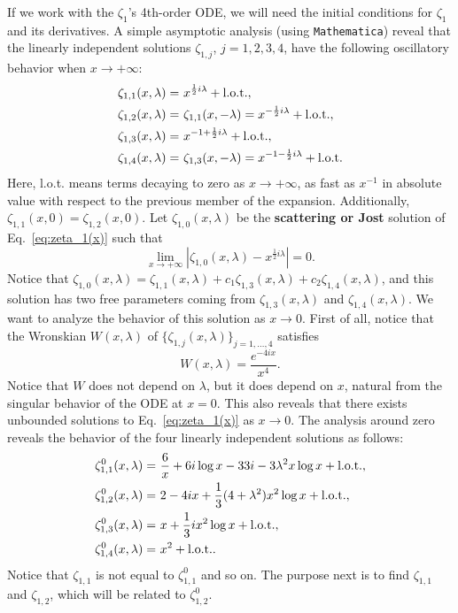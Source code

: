 \documentclass[
 aip,
 jmp,
 amsmath,amssymb,
 reprint,
 nofootinbib,
]{revtex4-2}
\begin{document}
If we work with the $\zeta_1$'s 4th-order ODE, we will need the initial conditions for $\zeta_1$ and its derivatives. A simple asymptotic analysis (using \texttt{Mathematica}) reveal that the linearly independent solutions $\zeta_{1,j}$, $j=1,2,3,4$,  have the following oscillatory behavior when $x\to +\infty$:
\begin{equation}
\begin{aligned}
\zeta_{1,1}(x,\lambda) =&~{} x^{ \frac12 i \lambda}+ \hbox{l.o.t.},\\
\zeta_{1,2}(x,\lambda) =&~{} \zeta_{1,1}(x,-\lambda) = x^{- \frac12 i \lambda}+ \hbox{l.o.t.},\\
\zeta_{1,3}(x,\lambda) =&~{} x^{-1+ \frac12 i \lambda}+ \hbox{l.o.t.},\\
\zeta_{1,4}(x,\lambda) =&~{} \zeta_{1,3}(x,-\lambda) =x^{-1- \frac12 i \lambda}+ \hbox{l.o.t.}
\end{aligned}
\end{equation}
Here, l.o.t. means terms decaying to zero as $x\to +\infty$, as fast as $x^{-1}$ in absolute value with respect to the previous member of the expansion. Additionally, $\zeta_{1,1}(x,0)=\zeta_{1,2}(x,0)$. Let $\zeta_{1,0}(x,\lambda)$ be the {\bf scattering or Jost} solution of Eq.~\eqref{eq:zeta_1(x)} such that 
\begin{equation}
\lim_{x\to +\infty} |\zeta_{1,0}(x,\lambda) - x^{ \frac12 i \lambda} | =0.
\end{equation}
Notice that $\zeta_{1,0}(x,\lambda) = \zeta_{1,1}(x,\lambda) + c_1 \zeta_{1,3}(x,\lambda) +c_2 \zeta_{1,4}(x,\lambda)$, and this solution has two free parameters coming from $\zeta_{1,3}(x,\lambda)$ and $\zeta_{1,4}(x,\lambda) $. We want to analyze the behavior of this solution as $x\to 0$. First of all, notice that the Wronskian $W(x,\lambda)$ of $\{\zeta_{1,j}(x,\lambda)\}_{j=1,\ldots,4}$ satisfies
\begin{equation}
W(x,\lambda) = \frac{e^{-4ix}}{x^4}.
\end{equation}
Notice that $W$ does not depend on $\lambda$, but it does depend on $x$, natural from the singular behavior of the ODE at $x=0$. This also reveals that there exists unbounded solutions to Eq.~\eqref{eq:zeta_1(x)} as $x\to 0$. The analysis around zero reveals the behavior of the four linearly independent solutions as follows:
\begin{equation}\label{eq:asymptotic-behaviour-x-zero}
\begin{aligned}
\zeta_{1,1}^0(x,\lambda) =&~{} \frac6x + 6i \log x -33i -3\lambda^2 x\log x+ \hbox{l.o.t.},\\
\zeta_{1,2}^0(x,\lambda) =&~{} 2-4ix +\frac13 (4+\lambda^2) x^2 \log x+ \hbox{l.o.t.},\\
\zeta_{1,3}^0(x,\lambda) =&~{} x +\frac13ix^2\log x + \hbox{l.o.t.},\\
\zeta_{1,4}^0(x,\lambda) =&~{} x^2 + \hbox{l.o.t.}.%
\end{aligned}
\end{equation}
Notice that $\zeta_{1,1}$ is not equal to $\zeta_{1,1}^0$ and so on. The purpose next is to find $\zeta_{1,1}$ and $\zeta_{1,2}$, which will be related to $\zeta_{1,2}^0$.
\end{document}
